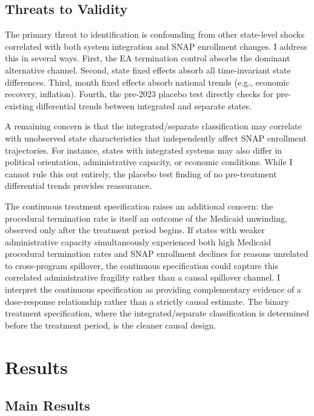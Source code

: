 \documentclass[12pt]{article}
\begin{document}
\subsection{Threats to Validity}

The primary threat to identification is confounding from other state-level shocks correlated with both system integration and SNAP enrollment changes. I address this in several ways. First, the EA termination control absorbs the dominant alternative channel. Second, state fixed effects absorb all time-invariant state differences. Third, month fixed effects absorb national trends (e.g., economic recovery, inflation). Fourth, the pre-2023 placebo test directly checks for pre-existing differential trends between integrated and separate states.

A remaining concern is that the integrated/separate classification may correlate with unobserved state characteristics that independently affect SNAP enrollment trajectories. For instance, states with integrated systems may also differ in political orientation, administrative capacity, or economic conditions. While I cannot rule this out entirely, the placebo test finding of no pre-treatment differential trends provides reassurance.

The continuous treatment specification raises an additional concern: the procedural termination rate is itself an outcome of the Medicaid unwinding, observed only after the treatment period begins. If states with weaker administrative capacity simultaneously experienced both high Medicaid procedural termination rates and SNAP enrollment declines for reasons unrelated to cross-program spillover, the continuous specification could capture this correlated administrative fragility rather than a causal spillover channel. I interpret the continuous specification as providing complementary evidence of a dose-response relationship rather than a strictly causal estimate. The binary treatment specification, where the integrated/separate classification is determined before the treatment period, is the cleaner causal design.


\section{Results}
\label{sec:results}

\subsection{Main Results}
\end{document}
